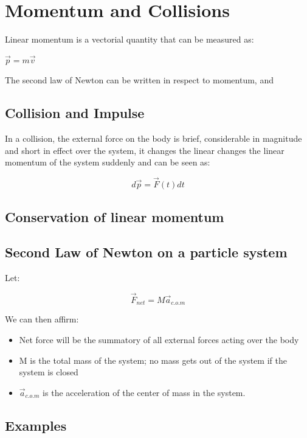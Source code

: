 \documentclass[11pt,fleqn]{book} %
\begin{document}
\chapter{Momentum and Collisions}

Linear momentum is a vectorial quantity that can be measured as:

$\vec{p} = m\vec{v}$

The second law of Newton can be written in respect to momentum, and 

\section{Collision and Impulse}

In a collision, the external force on the body is brief, considerable in magnitude and
short in effect over the system, it changes the linear
changes the linear momentum of the system suddenly and can be seen as:

\begin{equation}
    d \vec{p} = \vec{F} (t) dt
\end{equation}

\section{Conservation of linear momentum}

\section{Second Law of Newton on a particle system}

Let:

\begin{equation}
    \vec{F}_{net} = M \vec{a}_{c.o.m}
\end{equation}

We can then affirm:

\begin{itemize}
    \item Net force will be the summatory of all external forces acting over the
    body
    \item M is the total mass of the system; no mass gets out of the system if the system is closed
    \item $\vec{a}_{c.o.m}$ is the acceleration of the center of mass in the system. 
\end{itemize}

\section{Examples}
\end{document}
